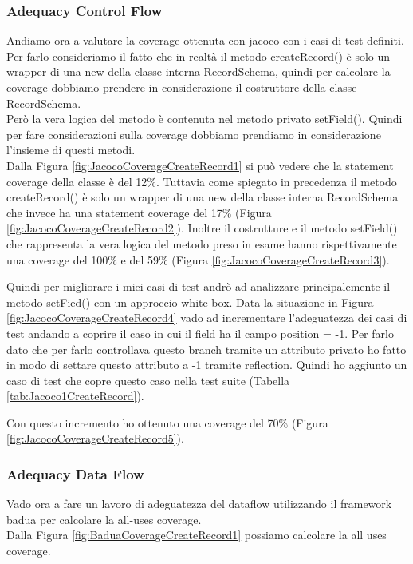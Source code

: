 \documentclass[12pt, a4paper]{article}
\begin{document}
\subsubsection{Adequacy Control Flow}

Andiamo ora a valutare la coverage ottenuta con jacoco con i casi di test definiti. Per farlo consideriamo il fatto
che in realtà il metodo createRecord() è solo un wrapper di una new della classe interna RecordSchema, quindi per calcolare
la coverage dobbiamo prendere in considerazione il costruttore della classe RecordSchema. \\ Però la vera logica del metodo
è contenuta nel metodo privato setField(). Quindi per fare considerazioni sulla coverage dobbiamo prendiamo in considerazione 
l'insieme di questi metodi. \\
Dalla Figura \ref{fig:JacocoCoverageCreateRecord1} si può vedere che la statement coverage della classe è del 12\%. Tuttavia come 
spiegato in precedenza il metodo createRecord() è solo un wrapper di una new della classe interna RecordSchema che invece ha una
statement coverage del 17\% (Figura \ref{fig:JacocoCoverageCreateRecord2}). Inoltre il costrutture e il metodo setField() 
che rappresenta la vera logica del metodo preso in esame hanno rispettivamente una coverage del 100\% e del 59\% 
(Figura \ref{fig:JacocoCoverageCreateRecord3}).

Quindi per migliorare i miei casi di test andrò ad analizzare principalemente il metodo setFied() con un approccio white box.
Data la situazione in Figura \ref{fig:JacocoCoverageCreateRecord4} vado ad incrementare l'adeguatezza dei casi di test
andando a coprire il caso in cui il field ha il campo position = -1. Per farlo dato che per farlo controllava questo branch 
tramite un attributo privato ho fatto in modo di settare questo attributo a -1 tramite reflection.
Quindi ho aggiunto un caso di test che copre questo caso nella test suite (Tabella \ref{tab:Jacoco1CreateRecord}).

Con questo incremento ho ottenuto una coverage del 70\% (Figura \ref{fig:JacocoCoverageCreateRecord5}).


\subsubsection{Adequacy Data Flow}

Vado ora a fare un lavoro di adeguatezza del dataflow utilizzando il framework badua per calcolare la all-uses coverage. \\
Dalla Figura \ref{fig:BaduaCoverageCreateRecord1} possiamo calcolare la all uses coverage. \\
\end{document}
